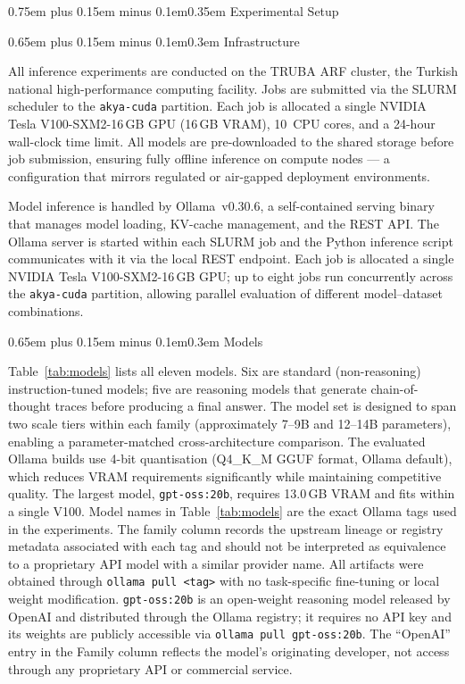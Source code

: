 \documentclass[10pt,a4paper,twocolumn]{article}
\makeatletter
\renewcommand\section{\@startsection{section}{1}{0pt}%
  {0.75em plus 0.15em minus 0.1em}{0.35em}%
  {\normalfont\normalsize\itshape}}
\renewcommand\subsection{\@startsection{subsection}{2}{0pt}%
  {0.65em plus 0.15em minus 0.1em}{0.3em}%
  {\normalfont\normalsize\itshape}}
\makeatother
\begin{document}
\section{Experimental Setup}
\label{sec:setup}

\subsection{Infrastructure}

All inference experiments are conducted on the TRUBA ARF cluster,
the Turkish national high-performance computing facility. Jobs are
submitted via the SLURM scheduler to the \texttt{akya-cuda} partition.
Each job is allocated a single NVIDIA Tesla V100-SXM2-16\,GB GPU
(16\,GB VRAM), 10~CPU cores, and a 24-hour wall-clock time limit.
All models are pre-downloaded to the shared storage before job submission,
ensuring fully offline inference on compute nodes --- a configuration
that mirrors regulated or air-gapped deployment environments.

Model inference is handled by Ollama~v0.30.6, a self-contained
serving binary that manages model loading, KV-cache management,
and the REST API. The Ollama server is started within each SLURM
job and the Python inference script communicates with it via
the local REST endpoint. Each job is allocated a single NVIDIA
Tesla V100-SXM2-16\,GB GPU; up to eight jobs run concurrently
across the \texttt{akya-cuda} partition, allowing parallel
evaluation of different model--dataset combinations.

\subsection{Models}

Table~\ref{tab:models} lists all eleven models. Six are standard
(non-reasoning) instruction-tuned models; five are reasoning models
that generate chain-of-thought traces before producing a final answer.
The model set is designed to span two scale tiers within each family
(approximately 7--9B and 12--14B parameters), enabling a parameter-matched
cross-architecture comparison. The evaluated Ollama builds use 4-bit
quantisation (Q4\_K\_M GGUF format, Ollama default), which reduces
VRAM requirements significantly while maintaining competitive quality.
The largest model, \texttt{gpt-oss:20b}, requires 13.0\,GB VRAM and
fits within a single V100.
Model names in Table~\ref{tab:models} are the exact Ollama tags used
in the experiments. The family column records the upstream lineage or
registry metadata associated with each tag and should not be interpreted
as equivalence to a proprietary API model with a similar provider name.
All artifacts were obtained through \texttt{ollama pull <tag>} with no
task-specific fine-tuning or local weight modification.
\texttt{gpt-oss:20b} is an open-weight reasoning model released by
OpenAI and distributed through the Ollama registry; it requires no API
key and its weights are publicly accessible via
\texttt{ollama pull gpt-oss:20b}.
The ``OpenAI'' entry in the Family column reflects the model's
originating developer, not access through any proprietary API or
commercial service.
\end{document}
